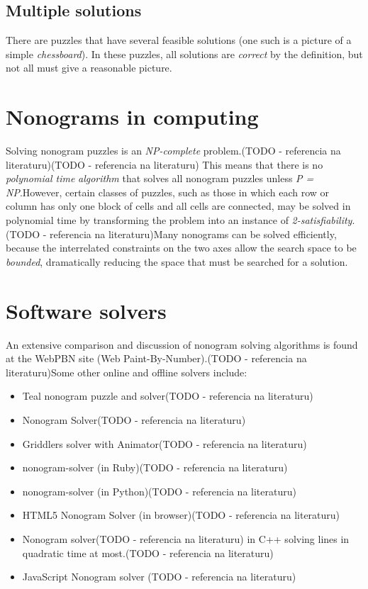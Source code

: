 {{\section{Multiple solutions}
There are puzzles that have several feasible solutions (one such is a picture of a simple \textit{chessboard}). In these puzzles, all solutions are \textit{correct} by the definition, but not all must give a reasonable picture.
\chapter{Nonograms in computing}
Solving nonogram puzzles is an \textit{NP-complete} problem.(TODO - referencia na literaturu)(TODO - referencia na literaturu)  This means that there is no \textit{polynomial time} \textit{algorithm} that solves all nonogram puzzles unless \textit{P = NP}.However, certain classes of puzzles, such as those in which each row or column has only one block of cells and all cells are connected, may be solved in polynomial time by transforming the problem into an instance of \textit{2-satisfiability}.(TODO - referencia na literaturu)Many nonograms can be solved efficiently, because the interrelated constraints on the two axes allow the search space to be \textit{bounded}, dramatically reducing the space that must be searched for a solution.
\chapter{Software solvers}
An extensive comparison and discussion of nonogram solving algorithms is found at the WebPBN site (Web Paint-By-Number).(TODO - referencia na literaturu)Some other online and offline solvers include:
\begin{itemize} \item {Teal nonogram puzzle and solver(TODO - referencia na literaturu)}\item {Nonogram Solver(TODO - referencia na literaturu)}\item {Griddlers solver with Animator(TODO - referencia na literaturu)}\item {nonogram-solver (in Ruby)(TODO - referencia na literaturu)}\item {nonogram-solver (in Python)(TODO - referencia na literaturu)}\item {HTML5 Nonogram Solver (in browser)(TODO - referencia na literaturu)}\item {Nonogram solver(TODO - referencia na literaturu) in C++ solving lines in quadratic time at most.(TODO - referencia na literaturu)}\item {JavaScript Nonogram solver (TODO - referencia na literaturu)} \end{itemize}

}}
